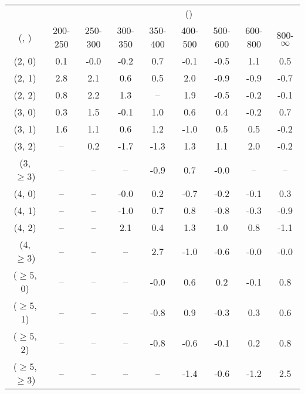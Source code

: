 \begin{table}[h!]
\tiny
\centering
{}
\begin{tabular}
{ccccccccc}
	\hline\hline
&	& \multicolumn{8}{c}{\scalht (\gev)} \\ 
	 (\njet,  \nb) & 200-250 & 250-300 & 300-350 & 350-400 & 400-500 & 500-600 & 600-800 & 800-$\infty$ \\ [0.8ex] 
\hline
	(2, 0) & 0.1 & -0.0 & -0.2 & 0.7 & -0.1 & -0.5 & 1.1 & 0.5 \\[0.5ex] 
	(2, 1) & 2.8 & 2.1 & 0.6 & 0.5 & 2.0 & -0.9 & -0.9 & -0.7 \\[0.5ex] 
	(2, 2) & 0.8 & 2.2 & 1.3 & -- & 1.9 & -0.5 & -0.2 & -0.1 \\[0.5ex] 
	(3, 0) & 0.3 & 1.5 & -0.1 & 1.0 & 0.6 & 0.4 & -0.2 & 0.7 \\[0.5ex] 
	(3, 1) & 1.6 & 1.1 & 0.6 & 1.2 & -1.0 & 0.5 & 0.5 & -0.2 \\[0.5ex] 
	(3, 2) & -- & 0.2 & -1.7 & -1.3 & 1.3 & 1.1 & 2.0 & -0.2 \\[0.5ex] 
	(3, $\ge3$) & -- & -- & -- & -0.9 & 0.7 & -0.0 & -- & -- \\[0.5ex] 
	(4, 0) & -- & -- & -0.0 & 0.2 & -0.7 & -0.2 & -0.1 & 0.3 \\[0.5ex] 
	(4, 1) & -- & -- & -1.0 & 0.7 & 0.8 & -0.8 & -0.3 & -0.9 \\[0.5ex] 
	(4, 2) & -- & -- & 2.1 & 0.4 & 1.3 & 1.0 & 0.8 & -1.1 \\[0.5ex] 
	(4, $\ge3$) & -- & -- & -- & 2.7 & -1.0 & -0.6 & -0.0 & -0.0 \\[0.5ex] 
	($\ge5$, 0) & -- & -- & -- & -0.0 & 0.6 & 0.2 & -0.1 & 0.8 \\[0.5ex] 
	($\ge5$, 1) & -- & -- & -- & -0.8 & 0.9 & -0.3 & 0.3 & 0.6 \\[0.5ex] 
	($\ge5$, 2) & -- & -- & -- & -0.8 & -0.6 & -0.1 & 0.2 & 0.8 \\[0.5ex] 
	($\ge5$, $\ge3$) & -- & -- & -- & -- & -1.4 & -0.6 & -1.2 & 2.5 \\[0.5ex] 
	\hline
	\hline
\end{tabular}
\end{table}
